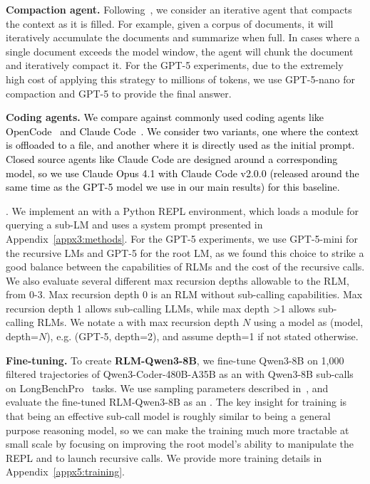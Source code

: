 \textbf{Compaction agent.} Following~\citet{sun2025scalinglonghorizonllmagent,wu2025resumunlockinglonghorizonsearch,yu2025memagentreshapinglongcontextllm}, we consider an iterative agent that compacts the context as it is filled. For example, given a corpus of documents, it will iteratively accumulate the documents and summarize when full. In cases where a single document exceeds the model window, the agent will chunk the document and iteratively compact it. For the GPT-5 experiments, due to the extremely high cost of applying this strategy to millions of tokens, we use GPT-5-nano for compaction and GPT-5 to provide the final answer.


\textbf{Coding agents.} \textcolor{black}{We compare against commonly used coding agents like OpenCode~\citep{anomalyco_opencode} and Claude Code~\citep{anthropic_claude_code_subagents}. We consider two variants, one where the context is offloaded to a file, and another where it is directly used as the initial prompt. Closed source agents like Claude Code are designed around a corresponding model, so we use Claude Opus 4.1 with Claude Code v2.0.0 (released around the same time as the GPT-5 model we use in our main results) for this baseline.}

\textbf{\RLM{}}. We implement an \RLM{} with a Python REPL environment, which loads a module for querying a sub-LM and uses a system prompt presented in Appendix~\ref{appx3:methods}. For the GPT-5 experiments, we use GPT-5-mini for the recursive LMs and GPT-5 for the root LM, as we found this choice to strike a good balance between the capabilities of RLMs and the cost of the recursive calls. We also evaluate several different max recursion depths allowable to the RLM, from 0-3. Max recursion depth 0 is an RLM without sub-calling capabilities. Max recursion depth 1 allows sub-calling LLMs, while max depth >1 allows sub-calling RLMs. We notate a \RLM{} with max recursion depth $N$ using a model as \RLM(model, depth=$N$), e.g. \RLM(GPT-5, depth=2), and assume depth=1 if not stated otherwise.


{\textbf{Fine-tuning.} To create \textbf{RLM-Qwen3-8B}, we fine-tune Qwen3-8B on 1,000 filtered trajectories of Qwen3-Coder-480B-A35B as an \RLM{} with Qwen3-8B sub-calls on LongBenchPro~\citep{chen2026longbenchprorealisticcomprehensive} tasks. We use sampling parameters described in~\citet{Qwen3-8B}, and evaluate the fine-tuned RLM-Qwen3-8B as an \RLM{}. The key insight for training is that being an effective sub-call model is roughly similar to being a general purpose reasoning model, so we can make the training much more tractable at small scale by focusing on improving the root model's ability to manipulate the REPL and to launch recursive calls. We provide more training details in Appendix~\ref{appx5:training}.}






